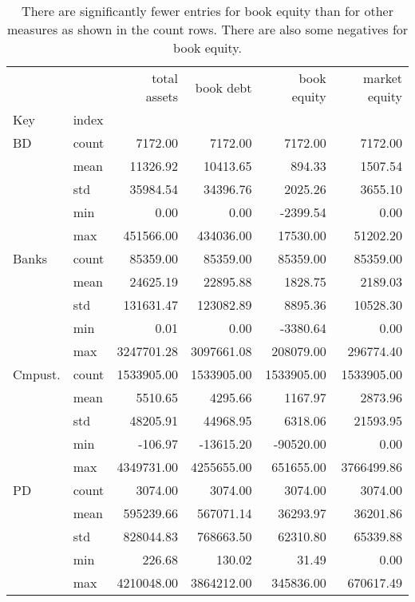 \begin{table}
\caption{
    There are significantly fewer entries for book equity
    than for other measures as shown in the count rows.
    There are also some negatives for book equity.
    }
\label{tab:Table 2.1}
\begin{tabular}{llrrrr}
\toprule
 &  & total assets & book debt & book equity & market equity \\
Key & index &  &  &  &  \\
\midrule
{BD} & count & 7172.00 & 7172.00 & 7172.00 & 7172.00 \\
 & mean & 11326.92 & 10413.65 & 894.33 & 1507.54 \\
 & std & 35984.54 & 34396.76 & 2025.26 & 3655.10 \\
 & min & 0.00 & 0.00 & -2399.54 & 0.00 \\
 & max & 451566.00 & 434036.00 & 17530.00 & 51202.20 \\
\cline{1-6}
{Banks} & count & 85359.00 & 85359.00 & 85359.00 & 85359.00 \\
 & mean & 24625.19 & 22895.88 & 1828.75 & 2189.03 \\
 & std & 131631.47 & 123082.89 & 8895.36 & 10528.30 \\
 & min & 0.01 & 0.00 & -3380.64 & 0.00 \\
 & max & 3247701.28 & 3097661.08 & 208079.00 & 296774.40 \\
\cline{1-6}
{Cmpust.} & count & 1533905.00 & 1533905.00 & 1533905.00 & 1533905.00 \\
 & mean & 5510.65 & 4295.66 & 1167.97 & 2873.96 \\
 & std & 48205.91 & 44968.95 & 6318.06 & 21593.95 \\
 & min & -106.97 & -13615.20 & -90520.00 & 0.00 \\
 & max & 4349731.00 & 4255655.00 & 651655.00 & 3766499.86 \\
\cline{1-6}
{PD} & count & 3074.00 & 3074.00 & 3074.00 & 3074.00 \\
 & mean & 595239.66 & 567071.14 & 36293.97 & 36201.86 \\
 & std & 828044.83 & 768663.50 & 62310.80 & 65339.88 \\
 & min & 226.68 & 130.02 & 31.49 & 0.00 \\
 & max & 4210048.00 & 3864212.00 & 345836.00 & 670617.49 \\
\cline{1-6}
\bottomrule
\end{tabular}
\end{table}
